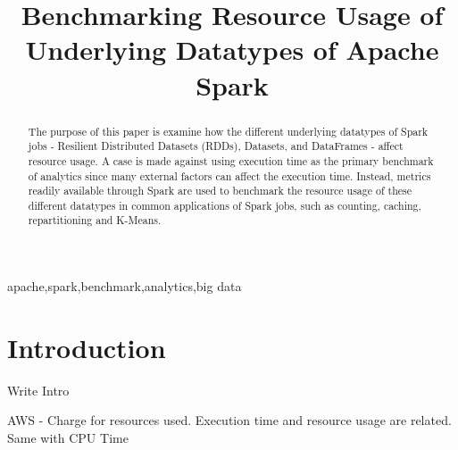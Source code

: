 \documentclass[conference]{IEEEtran}
\begin{document}
\title{Benchmarking Resource Usage of Underlying Datatypes of Apache Spark\\
}

\author{
\and
{}
\and
{}
}

\maketitle

\begin{abstract}
The purpose of this paper is examine how the different underlying datatypes of Spark jobs - Resilient Distributed Datasets (RDDs),
Datasets, and DataFrames - affect resource usage.
A case is made against using execution time as the primary benchmark of analytics since many external factors can affect the execution time.
Instead, metrics readily available through Spark are used to benchmark the resource usage of these different datatypes in common applications of Spark jobs, such as counting, caching, repartitioning and K-Means.
\end{abstract}

\begin{IEEEkeywords}
apache,spark,benchmark,analytics,big data
\end{IEEEkeywords}

\section{Introduction}
Write Intro

AWS - Charge for resources used.  Execution time and resource usage are related.  Same with CPU Time
\end{document}
